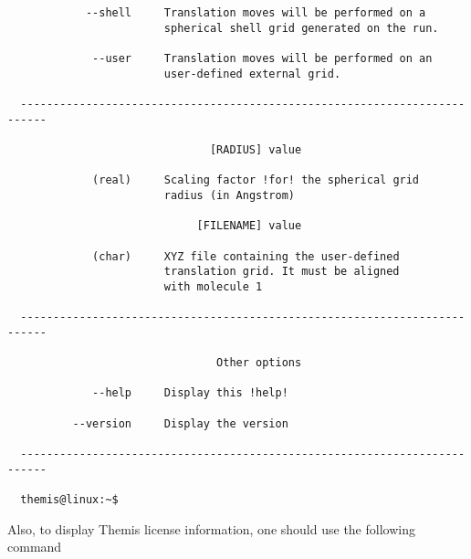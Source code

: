 \documentclass{achemso}
\begin{document}
\begin{center}
\begin{minipage}{0.7\textwidth}
\begin{verbatim}
            --shell     Translation moves will be performed on a
                        spherical shell grid generated on the run.

             --user     Translation moves will be performed on an
                        user-defined external grid.

  --------------------------------------------------------------------------

                               [RADIUS] value

             (real)     Scaling factor !for! the spherical grid
                        radius (in Angstrom)

                             [FILENAME] value

             (char)     XYZ file containing the user-defined
                        translation grid. It must be aligned
                        with molecule 1

  --------------------------------------------------------------------------

                                Other options

             --help     Display this !help!

          --version     Display the version

  --------------------------------------------------------------------------

  themis@linux:~$

    \end{verbatim}
  \end{minipage}
\end{center}

  Also, to display Themis license information, one should use the following
  command
\end{document}
